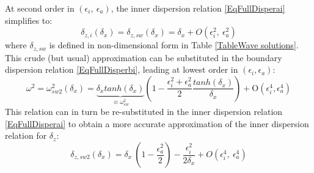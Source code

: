\documentclass[a4paper,11pt]{article}
\begin{document}
At second order in $(\epsilon_i,\ \epsilon_a)$, the inner dispersion relation \ref{EqFullDisperai} simplifies to:
\begin{equation}
	\label{Eqdzdx1}
	\displaystyle
	\delta_{z,i}(\delta_x) = \delta_{z,sw}(\delta_x)=\delta_x + O(\epsilon_i^2,\ \epsilon_a^2)
\end{equation}
where $\delta_{z,sw}$ is defined in non-dimensional form in Table \ref{TableWave solutions}. This crude (but usual) approximation can be substituted in the boundary dispersion relation \ref{EqFullDisperbi}, leading at lowest order in $(\epsilon_i,\epsilon_a)$:
\begin{equation}
	\label{EqDispLonga1}
	\displaystyle
	\omega^2=\omega_{sw2}^2(\delta_x) =\underbrace{\delta_x
	 tanh(\delta_{x})}_{\equiv\omega_{sw}^2}
	 \left(1-
	 \frac{\epsilon_i^2+\epsilon_a^2}{2}\frac{tanh(\delta_{x})}{\delta_x}
	 \right)
	 + \mathrm{O}(\epsilon_i^4,\epsilon_a^4)
\end{equation}
This relation can in turn be re-substituted in the inner dispersion relation \ref{EqFullDisperai} to obtain a more accurate approximation of the inner dispersion relation for $\delta_z$:
\begin{equation}
	\label{Eqdzdx2}
	\displaystyle
	\delta_{z,sw2}(\delta_x) = \delta_x\ \left( 1-\frac{\epsilon_a^2}{2} \right)
	 - \frac{\epsilon_i^2}{2\delta_x}+ O(\epsilon_i^4,\ \epsilon_a^4)
\end{equation}
\end{document}
